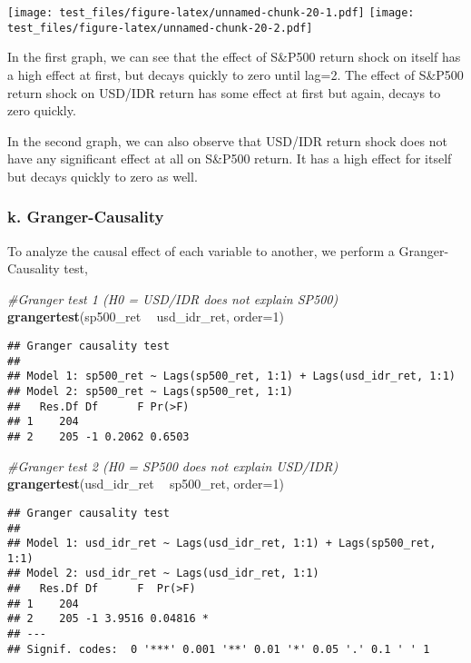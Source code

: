 \documentclass[]{article}
\newenvironment{Shaded}{\begin{snugshade}}{\end{snugshade}}
\newcommand{\KeywordTok}[1]{\textcolor[rgb]{0.13,0.29,0.53}{\textbf{#1}}}
\newcommand{\DataTypeTok}[1]{\textcolor[rgb]{0.13,0.29,0.53}{#1}}
\newcommand{\DecValTok}[1]{\textcolor[rgb]{0.00,0.00,0.81}{#1}}
\newcommand{\StringTok}[1]{\textcolor[rgb]{0.31,0.60,0.02}{#1}}
\newcommand{\CommentTok}[1]{\textcolor[rgb]{0.56,0.35,0.01}{\textit{#1}}}
\newcommand{\OperatorTok}[1]{\textcolor[rgb]{0.81,0.36,0.00}{\textbf{#1}}}
\newcommand{\NormalTok}[1]{#1}
\begin{document}
\texttt{[image: test\_files/figure-latex/unnamed-chunk-20-1.pdf]}
\texttt{[image: test\_files/figure-latex/unnamed-chunk-20-2.pdf]}

In the first graph, we can see that the effect of S\&P500 return shock
on itself has a high effect at first, but decays quickly to zero until
lag=2. The effect of S\&P500 return shock on USD/IDR return has some
effect at first but again, decays to zero quickly.

In the second graph, we can also observe that USD/IDR return shock does
not have any significant effect at all on S\&P500 return. It has a high
effect for itself but decays quickly to zero as well.

\subsubsection{k. Granger-Causality}\label{k.-granger-causality}

To analyze the causal effect of each variable to another, we perform a
Granger-Causality test,

\begin{Shaded}
\begin{Highlighting}[]
\CommentTok{#Granger test 1 (H0 = USD/IDR does not explain SP500)}
\KeywordTok{grangertest}\NormalTok{(sp500_ret }\OperatorTok{~}\StringTok{ }\NormalTok{usd_idr_ret, }\DataTypeTok{order=}\DecValTok{1}\NormalTok{)}
\end{Highlighting}
\end{Shaded}

\begin{verbatim}
## Granger causality test
## 
## Model 1: sp500_ret ~ Lags(sp500_ret, 1:1) + Lags(usd_idr_ret, 1:1)
## Model 2: sp500_ret ~ Lags(sp500_ret, 1:1)
##   Res.Df Df      F Pr(>F)
## 1    204                 
## 2    205 -1 0.2062 0.6503
\end{verbatim}

\begin{Shaded}
\begin{Highlighting}[]
\CommentTok{#Granger test 2 (H0 = SP500 does not explain USD/IDR)}
\KeywordTok{grangertest}\NormalTok{(usd_idr_ret }\OperatorTok{~}\StringTok{ }\NormalTok{sp500_ret, }\DataTypeTok{order=}\DecValTok{1}\NormalTok{)}
\end{Highlighting}
\end{Shaded}

\begin{verbatim}
## Granger causality test
## 
## Model 1: usd_idr_ret ~ Lags(usd_idr_ret, 1:1) + Lags(sp500_ret, 1:1)
## Model 2: usd_idr_ret ~ Lags(usd_idr_ret, 1:1)
##   Res.Df Df      F  Pr(>F)  
## 1    204                    
## 2    205 -1 3.9516 0.04816 *
## ---
## Signif. codes:  0 '***' 0.001 '**' 0.01 '*' 0.05 '.' 0.1 ' ' 1
\end{verbatim}
\end{document}
